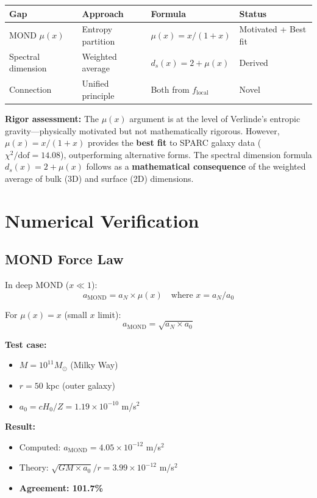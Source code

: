 \documentclass[11pt,a4paper]{article}
\theoremstyle{plain}
\theoremstyle{definition}
\theoremstyle{remark}
\begin{document}
\begin{center}
\begin{tabular}{llll}
\toprule
\textbf{Gap} & \textbf{Approach} & \textbf{Formula} & \textbf{Status} \\
\midrule
MOND $\mu(x)$ & Entropy partition & $\mu(x) = x/(1+x)$ & Motivated + Best fit \\
Spectral dimension & Weighted average & $d_s(x) = 2 + \mu(x)$ & Derived \\
Connection & Unified principle & Both from $f_{\text{local}}$ & Novel \\
\bottomrule
\end{tabular}
\end{center}

\textbf{Rigor assessment:} The $\mu(x)$ argument is at the level of Verlinde's entropic gravity---physically motivated but not mathematically rigorous. However, $\mu(x) = x/(1+x)$ provides the \textbf{best fit} to SPARC galaxy data ($\chi^2/\text{dof} = 14.08$), outperforming alternative forms. The spectral dimension formula $d_s(x) = 2 + \mu(x)$ follows as a \textbf{mathematical consequence} of the weighted average of bulk (3D) and surface (2D) dimensions.

\section{Numerical Verification}

\subsection{MOND Force Law}

In deep MOND ($x \ll 1$):
\[
a_{\text{MOND}} = a_N \times \mu(x) \quad \text{where } x = a_N/a_0
\]

For $\mu(x) = x$ (small $x$ limit):
\[
a_{\text{MOND}} = \sqrt{a_N \times a_0}
\]

\textbf{Test case:}
\begin{itemize}
  \item $M = 10^{11} M_\odot$ (Milky Way)
  \item $r = 50$ kpc (outer galaxy)
  \item $a_0 = cH_0/Z = 1.19 \times 10^{-10}$ m/s$^2$
\end{itemize}

\textbf{Result:}
\begin{itemize}
  \item Computed: $a_{\text{MOND}} = 4.05 \times 10^{-12}$ m/s$^2$
  \item Theory: $\sqrt{GM \times a_0}/r = 3.99 \times 10^{-12}$ m/s$^2$
  \item \textbf{Agreement: 101.7\%} \checkmark
\end{itemize}
\end{document}
